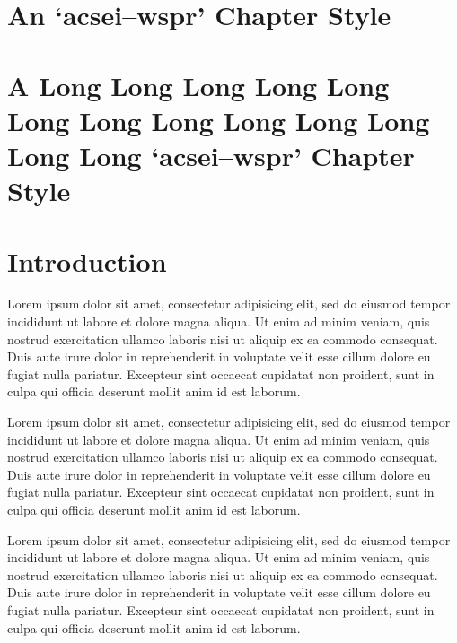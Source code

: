 \documentclass[10pt,a4paper,extrafontsizes,oldfontcommands,oneside]{memoir}
\begin{document}
\chapter{An `acsei--wspr' Chapter Style} %
\label{chap:a_acsei_chapter_style}



\chapter{A Long Long Long Long Long Long Long Long Long Long Long Long Long `acsei--wspr' Chapter Style} %
\label{chap:a_long_acsei_chapter_style}




\chapter{Introduction}

Lorem ipsum dolor sit amet, consectetur adipisicing elit, sed do eiusmod tempor incididunt ut labore et dolore magna aliqua. Ut enim ad minim veniam, quis nostrud exercitation ullamco laboris nisi ut aliquip ex ea commodo consequat. Duis aute irure dolor in reprehenderit in voluptate velit esse cillum dolore eu fugiat nulla pariatur. Excepteur sint occaecat cupidatat non proident, sunt in culpa qui officia deserunt mollit anim id est laborum.

Lorem ipsum dolor sit amet, consectetur adipisicing elit, sed do eiusmod tempor incididunt ut labore et dolore magna aliqua. Ut enim ad minim veniam, quis nostrud exercitation ullamco laboris nisi ut aliquip ex ea commodo consequat. Duis aute irure dolor in reprehenderit in voluptate velit esse cillum dolore eu fugiat nulla pariatur. Excepteur sint occaecat cupidatat non proident, sunt in culpa qui officia deserunt mollit anim id est laborum.

Lorem ipsum dolor sit amet, consectetur adipisicing elit, sed do eiusmod tempor incididunt ut labore et dolore magna aliqua. Ut enim ad minim veniam, quis nostrud exercitation ullamco laboris nisi ut aliquip ex ea commodo consequat. Duis aute irure dolor in reprehenderit in voluptate velit esse cillum dolore eu fugiat nulla pariatur. Excepteur sint occaecat cupidatat non proident, sunt in culpa qui officia deserunt mollit anim id est laborum.
\end{document}
